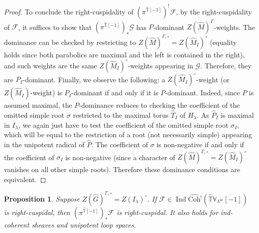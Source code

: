 \documentclass{amsart}
\newtheorem{proposition}[theorem]{Proposition}
\theoremstyle{definition}
\theoremstyle{remark}
\numberwithin{equation}{section}
\DeclareMathOperator{\Ind}{Ind}
\newcommand{\mc}{\mathcal}
\newcommand{\wh}{\widehat}
\newcommand{\Coh}{\mathrm{Coh}}
\newcommand{\ur}{\mathrm{ur}}
\newcommand{\V}{\mathbb{V}}
\newcommand{\T}{\mathbb{T}}
\begin{document}
\begin{proof}
To conclude the right-cuspidality of $(\pi^{\wh{\T}[-1]})^! \mc F$, by the right-cuspidality of $\mc F$, it suffices to show that $(\pi^{\wh{\T}[-1]})_* \mc G$ has $P$-dominant $Z(\wh M)^{\Gamma}$-weights. The dominance can be checked by restricting to $Z(\wh M)^{\Gamma,\circ}=Z(\wh M_I)^\circ$ (equality holds since both parabolics are maximal and the left is contained in the right), and such weights are the same $Z(\wh M_I)^\circ$-weights appearing in $\mc G$. Therefore, they are $P_I$-dominant. Finally, we observe the following: a $Z(\wh M_I)^\circ$-weight (or $Z(\wh M_I)$-weight) is $P_I$-dominant if and only if it is $P$-dominant. Indeed, since $P$ is assumed maximal, the $P$-dominance reduces to checking the coefficient of the omitted simple root $\sigma$ restricted to the maximal torus $\wh T_I$ of $H_{\lambda}$. As $\wh P_I$ is maximal in $I_{\lambda}$, we again just have to test the coefficient of the omitted simple root $\sigma_I$, which will be equal to the restriction of a root (not necessarily simple) appearing in the unipotent radical of $\wh{P}$. The coefficient of $\sigma$ is non-negative if and only if the coefficient of $\sigma_I$ is non-negative (since a character of $Z(\wh{M})^{\Gamma, \circ}=Z(\wh{M}_I)^{\circ}$ vanishes on all other simple roots). Therefore these dominance conditions are equivalent. 
\end{proof}

\begin{proposition}\label{prop: PushforwardIlambdaCuspidal}
Suppose $Z(\wh G)^{\Gamma,\circ}=Z(I_\lambda)^{\circ}$. If $\mc F\in \Ind\wh{\Coh}{}^! (\wh{\T}\V_{\lambda^\ur}[-1])$ is right-cuspidal, then $(\pi^{\wh{\T}[-1]})_* \mc F$ is right-cuspidal. It also holds for ind-coherent sheaves and unipotent loop spaces. 
\end{proposition}
\end{document}
